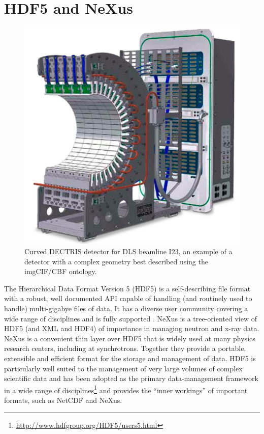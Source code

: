 \documentclass[11pt]{a0poster}
\begin{document}
\hspace{10mm}\hfill\begin{minipage}[]{0.29\linewidth}



 
\section*{HDF5 and NeXus}%


\begin{figure}
\begin{center}
\includegraphics[width=4.5in]{I23}
\caption{\fontsize{16}{20}\selectfont %
Curved DECTRIS detector
for DLS beamline I23, an example of a detector with a complex geometry 
best described using the imgCIF/CBF ontology.
}
\label{fig:i23}
\end{center}
\end{figure}

The Hierarchical Data Format Version 5 (HDF5) is a self-describing
file format with a robust, well documented API capable of handling
(and routinely used to handle) multi-gigabye files of data.  It has a
diverse user community covering a wide range of disciplines and is 
fully supported \cite{Dougherty2009}. NeXus \cite{Filges2001} is a
tree-oriented view of HDF5 (and XML and HDF4) of importance in
managing neutron and x-ray data.  NeXus is a convenient thin layer
over HDF5 that is widely used at many physics research centers,
including at synchrotrons. Together they provide a portable,
extensible and efficient format for the storage and management of data.
HDF5 is particularly well suited to the management of very large volumes of
complex scientific data and has been adopted as the primary data-management
framework in a wide range of
disciplines\footnote{\url{http://www.hdfgroup.org/HDF5/users5.html}}
and provides the ``inner workings'' of important formats, such as
NetCDF \cite{Rew2004} and NeXus. 


\end{minipage}
\end{document}
